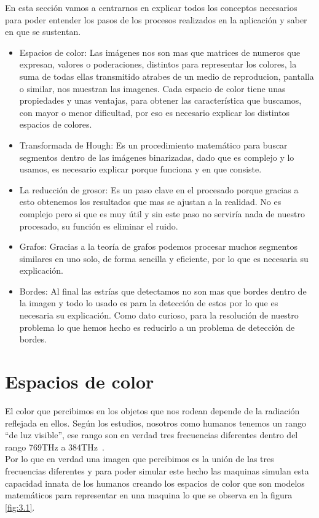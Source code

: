 En esta sección vamos a centrarnos en explicar todos los conceptos necesarios para poder entender los pasos de los procesos realizados en la aplicación y saber en que se sustentan.

\begin{itemize}
\item Espacios de color: Las imágenes nos son mas que matrices de numeros que expresan, valores o poderaciones, distintos para representar los colores, la suma de todas ellas transmitido atrabes de un medio de reproducion, pantalla o similar, nos muestran las imagenes.
Cada espacio de color tiene unas propiedades y unas ventajas, para obtener las característica que buscamos, con mayor o menor dificultad, por eso es necesario explicar los distintos espacios de colores.

\item Transformada de Hough: Es un procedimiento matemático para buscar segmentos dentro de las imágenes binarizadas, dado que es complejo y lo usamos, es necesario explicar porque funciona y en que consiste.

\item La reducción de grosor: Es un paso clave en el procesado porque gracias a esto obtenemos los resultados que mas se ajustan a la realidad.
No es complejo pero si que es muy útil y sin este paso no serviría nada de nuestro procesado, su función es eliminar el ruido.

\item Grafos: Gracias a la teoría de grafos podemos procesar muchos segmentos similares en uno solo, de forma sencilla y eficiente, por lo que es necesaria su explicación.

\item Bordes: Al final las estrías que detectamos no son mas que bordes dentro de la imagen y todo lo usado es para la detección de estos por lo que es necesaria su explicación. Como dato curioso, para la resolución de nuestro problema lo que hemos hecho es reducirlo a un problema de detección de bordes.
\end{itemize}



\section{Espacios de color }
El color que percibimos en los objetos que nos rodean depende de la radiación reflejada en ellos. Según los estudios, nosotros como humanos tenemos un rango ``de luz visible'', ese rango son en verdad tres frecuencias diferentes dentro del rango 769THz a 384THz~\cite{Manual:HAE}.\\
Por lo que en verdad una imagen que percibimos es la unión de las tres frecuencias diferentes y para poder simular este hecho las maquinas simulan esta capacidad innata de los humanos creando los espacios de color que son modelos matemáticos para representar en una maquina lo que se observa en la figura \ref{fig:3.1}.

